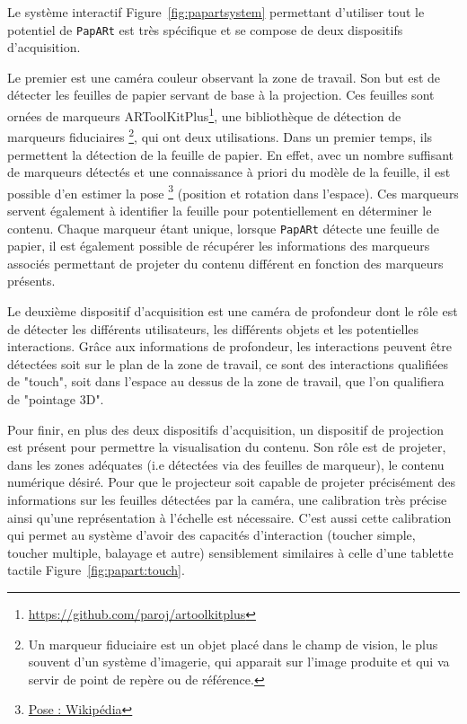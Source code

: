 Le système interactif Figure~\ref{fig:papartsystem} permettant d'utiliser tout le potentiel de \texttt{PapARt} est très spécifique et se compose de deux dispositifs d'acquisition.

Le premier est une caméra couleur observant la zone de travail. Son but est de détecter les feuilles de papier servant de base à la projection. Ces feuilles sont ornées de marqueurs ARToolKitPlus\footnote{\href{https://github.com/paroj/artoolkitplus}{https://github.com/paroj/artoolkitplus}}, une bibliothèque de détection de marqueurs fiduciaires \footnote{Un marqueur fiduciaire est un objet placé dans le champ de vision, le plus souvent d'un système d'imagerie, qui apparait sur l'image produite et qui va servir de point de repère ou de référence.}, qui ont deux utilisations. 
Dans un premier temps, ils permettent la détection de la feuille de papier. En effet, avec un nombre suffisant de marqueurs détectés et une connaissance à priori du modèle de la feuille, il est possible d'en estimer la pose \footnote{\href{https://en.wikipedia.org/wiki/Pose_(computer_vision)}{Pose : Wikipédia}} (position et rotation dans l'espace). 
Ces marqueurs servent également à identifier la feuille pour potentiellement en déterminer le contenu. Chaque marqueur étant unique, lorsque \texttt{PapARt} détecte une feuille de papier, il est également possible de récupérer les informations des marqueurs associés permettant de projeter du contenu différent en fonction des marqueurs présents.

Le deuxième dispositif d'acquisition est une caméra de profondeur dont le rôle est de détecter les différents utilisateurs, les différents objets et les potentielles interactions. Grâce aux informations de profondeur, les interactions peuvent être détectées soit sur le plan de la zone de travail, ce sont des interactions qualifiées de "touch", soit dans l'espace au dessus de la zone de travail, que l'on qualifiera de "pointage 3D".

Pour finir, en plus des deux dispositifs d'acquisition, un dispositif de projection est présent pour permettre la visualisation du contenu. Son rôle est de projeter, dans les zones adéquates (i.e détectées via des feuilles de marqueur), le contenu numérique désiré. Pour que le projecteur soit capable de projeter précisément des informations sur les feuilles détectées par la caméra, une calibration très précise ainsi qu'une représentation à l'échelle est nécessaire. C'est aussi cette calibration qui permet au système d'avoir des capacités d'interaction (toucher simple, toucher multiple, balayage et autre) sensiblement similaires à celle d'une tablette tactile Figure~\ref{fig:papart:touch}.

